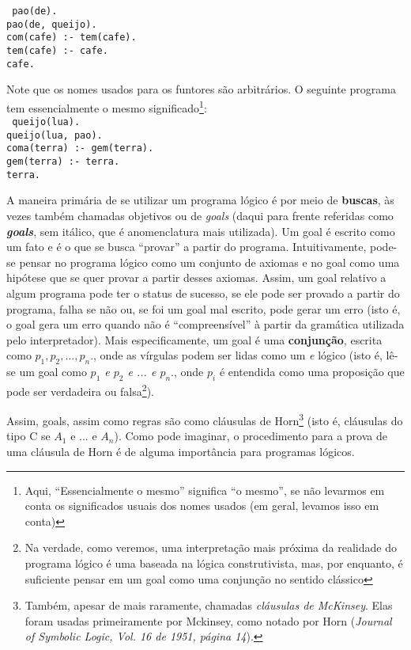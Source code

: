 \documentclass{article}
\theoremstyle{definition}
\theoremstyle{remark}
\begin{document}
\tt{
  pao(de).\\
  pao(de, queijo).\\
  com(cafe) :- tem(cafe).\\
  tem(cafe) :- cafe.\\
  cafe.
}

Note que os nomes usados para os funtores são arbitrários. O seguinte programa tem essencialmente o mesmo significado\footnote{ Aqui, ``Essencialmente o mesmo'' significa ``o mesmo'', se não levarmos em conta os significados usuais dos nomes usados (em geral, levamos isso em conta)}:\\

\tt{
  queijo(lua).\\
  queijo(lua, pao).\\
  coma(terra) :- gem(terra).\\
  gem(terra) :- terra.\\
  terra.
}

A maneira primária de se utilizar um programa lógico é por meio de \textbf{buscas}, às vezes também chamadas objetivos ou de \textit{goals} (daqui para frente referidas como \textbf{\textit{goals}}, sem itálico, que é anomenclatura mais utilizada). Um goal é escrito como um fato e é o que se busca ``provar'' a partir do programa. Intuitivamente, pode-se pensar no programa lógico como um conjunto de axiomas e no goal como uma hipótese que se quer provar a partir desses axiomas. Assim, um goal
relativo a algum programa pode ter o status de sucesso, se ele pode ser provado a partir do programa, falha se não ou, se foi um goal mal escrito, pode gerar um erro (isto é, o goal gera um erro quando não é ``compreensível'' à partir da gramática utilizada pelo interpretador). Mais especificamente, um goal é uma \textbf{conjunção}, escrita como \textit{$p_1,p_2,...,p_n.$}, onde as vírgulas podem ser lidas como um \textit{e} lógico (isto é, lê-se um goal como \textit{$p_1$ e $p_2$ e ... e
  $p_n.$}, onde $p_i$ é
entendida como uma proposição que pode ser verdadeira ou falsa\footnote{Na verdade, como veremos, uma interpretação mais próxima da realidade do programa lógico é uma baseada na lógica construtivista, mas, por enquanto, é suficiente pensar em um goal como uma conjunção no sentido clássico}).

Assim, goals, assim como regras são como cláusulas de Horn\footnote{Também, apesar de mais raramente, chamadas \textit{cláusulas de McKinsey}. Elas foram usadas primeiramente por Mckinsey, como notado por Horn (\textit{Journal of Symbolic Logic, Vol. 16 de 1951, página 14}).} (isto é, cláusulas do tipo C se $A_1$ e ... e $A_n$). Como pode imaginar, o procedimento para a prova de uma cláusula de Horn é de alguma importância para programas lógicos.
\end{document}

